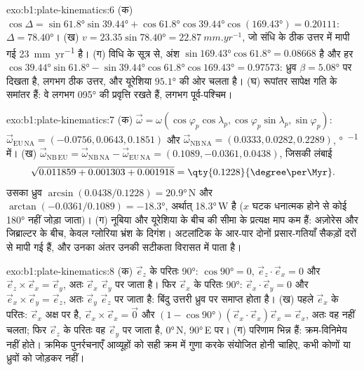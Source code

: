\begin{solution}{exo:b1:plate-kinematics:6}
(क) $\cos\Delta = \sin\ang{61.8}\sin\ang{39.44} + \cos\ang{61.8}\cos\ang{39.44}
\cos(\ang{169.43}) = 0.20111$: $\Delta = \ang{78.40}$। (ख) $v = 23.35
\sin\ang{78.40} = \qty{22.87}{mm.yr^{-1}}$, जो संधि के ठीक उत्तर में मापी गई \qty{23}{mm.yr^{-1}} है। (ग) विधि के सूत्र से, अंश
$\sin\ang{169.43}\cos\ang{61.8} = 0.08668$ है और हर
$\cos\ang{39.44}\sin\ang{61.8} - \sin\ang{39.44}\cos\ang{61.8}\cos\ang{169.43}
= 0.97573$: ध्रुव $\beta = \ang{5.08}$ पर दिखता है, लगभग ठीक उत्तर, और यूरेशिया $\ang{95.1}$ की ओर चलता है। (घ) रूपांतर सापेक्ष गति के समांतर हैं: वे लगभग \ang{095} की प्रवृत्ति रखते हैं, लगभग पूर्व-पश्चिम।
\end{solution}

\begin{solution}{exo:b1:plate-kinematics:7}
(क) $\vec\omega = \omega(\cos\varphi_p\cos\lambda_p, \cos\varphi_p\sin\lambda_p,
\sin\varphi_p)$: $\vec\omega_{\mathrm{EU\,NA}} = (-0.0756, 0.0643, 0.1851)$ और
$\vec\omega_{\mathrm{NB\,NA}} = (0.0333, 0.0282, 0.2289)$, \unit{\degree\per\Myr} में। (ख) $\vec\omega_{\mathrm{NB\,EU}} =
\vec\omega_{\mathrm{NB\,NA}} - \vec\omega_{\mathrm{EU\,NA}} = (0.1089, -0.0361,
0.0438)$, जिसकी लंबाई
\[
  \sqrt{0.011859 + 0.001303 + 0.001918} = \qty{0.1228}{\degree\per\Myr}.
\]
उसका ध्रुव 
$\arcsin(0.0438/0.1228) = \ang{20.9}$\,N और 
$\arctan(-0.0361/0.1089) = \ang{-18.3}$, अर्थात् \ang{18.3}\,W है ($x$ घटक धनात्मक होने से कोई \ang{180} नहीं जोड़ा जाता)। (ग) नूबिया और यूरेशिया के बीच की सीमा के प्रत्यक्ष माप कम हैं: अज़ोरेस और जिब्राल्टर के बीच, केवल ग्लोरिया भ्रंश के दिगंश। अटलांटिक के आर-पार दोनों प्रसार-गतियाँ सैकड़ों दरों से मापी गई हैं, और उनका अंतर उनकी सटीकता विरासत में पाता है।
\end{solution}

\begin{solution}{exo:b1:plate-kinematics:8}
(क) $\vec e_z$ के परितः \ang{90}: $\cos\ang{90} = 0$, $\vec e_z\cdot\vec e_x = 0$
और $\vec e_z\times\vec e_x = \vec e_y$, अतः $\vec e_x$ $\vec e_y$ पर जाता है। फिर $\vec e_x$ के परितः \ang{90}: $\vec e_x\cdot\vec e_y = 0$ और
$\vec e_x\times\vec e_y = \vec e_z$, अतः $\vec e_y$ $\vec e_z$ पर जाता है: बिंदु उत्तरी ध्रुव पर समाप्त होता है। (ख) पहले $\vec e_x$ के परितः: $\vec e_x$ अक्ष पर है,
$\vec e_x\times\vec e_x = \vec 0$ और $(1 - \cos\ang{90})(\vec e_x\cdot\vec e_x)
\vec e_x = \vec e_x$, अतः वह नहीं चलता; फिर $\vec e_z$ के परितः वह $\vec e_y$ पर जाता है, \ang{0}\,N, \ang{90}\,E पर। (ग) परिणाम भिन्न हैं:  क्रम-विनिमेय नहीं होते। क्रमिक पुनर्रचनाएँ आव्यूहों को सही क्रम में गुणा करके संयोजित होनी चाहिए, कभी कोणों या ध्रुवों को जोड़कर नहीं।
\end{solution}

